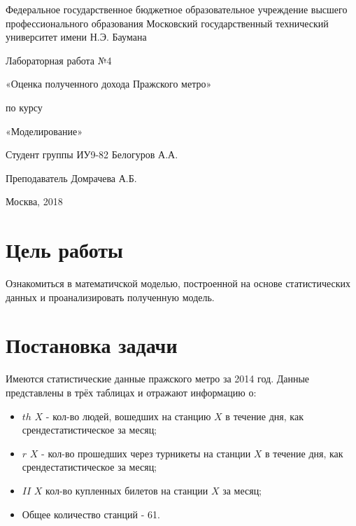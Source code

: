\documentclass[a4paper, 12pt]{article}   	%
\begin{document}
\begin{titlepage}

\thispagestyle{empty}

\begin{center}
Федеральное государственное бюджетное образовательное учреждение высшего профессионального образования Московский государственный технический университет имени Н.Э. Баумана
\end{center}


\vfill

\centerline{\large{Лабораторная работа №4}}

\centerline{\large{«Оценка полученного дохода Пражского метро»}} 

\centerline{\large{по курсу}}
\centerline{\large{«Моделирование»}}


\vfill

Студент группы ИУ9-82 \hfill Белогуров А.А.

Преподаватель \hfill Домрачева А.Б.
\vfill

\centerline{Москва, 2018}
\clearpage
\end{titlepage}

\newpage
\setcounter{page}{2}

\tableofcontents

\newpage

\section{Цель работы}
    Ознакомиться в математичской моделью, построенной на основе статистических данных и проанализировать полученную модель.
 
\newpage

\section{Постановка задачи}
    Имеются статистические данные пражского метро за 2014 год. Данные представлены в трёх таблицах и отражают информацию о:
    
    \begin{itemize}
        \item $th$ $X$ - кол-во людей, вошедших на станцию $X$ в течение дня, как срендестатистическое за месяц;
        \item $r$ $X$ - кол-во прошедших через турникеты на станции $X$ в течение дня, как срендестатистическое за месяц;
        \item $II$ $X$ кол-во купленных билетов на станции $X$ за месяц;
        \item Общее количество станций - 61.
    \end{itemize}
    
\end{document}
